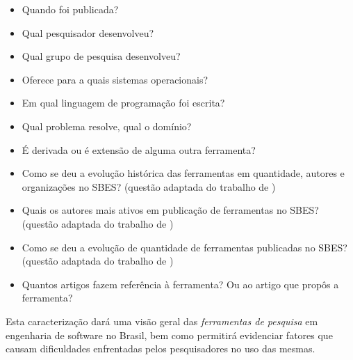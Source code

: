 \documentclass[conference]{IEEEtran}
\begin{document}
\begin{itemize}
\item Quando foi publicada?
\item Qual pesquisador desenvolveu?
\item Qual grupo de pesquisa desenvolveu?
\item Oferece para a quais sistemas operacionais?
\item Em qual linguagem de programação foi escrita?
\item Qual problema resolve, qual o domínio?
\item É derivada ou é extensão de alguma outra ferramenta?
\item Como se deu a evolução histórica das ferramentas em quantidade, autores
  e organizações no SBES? (questão adaptada do trabalho de
  \cite{Cavalcanti11})
\item Quais os autores mais ativos em publicação de ferramentas no SBES?
  (questão adaptada do trabalho de \cite{Cavalcanti11})
\item Como se deu a evolução de quantidade de ferramentas publicadas no SBES?
  (questão adaptada do trabalho de \cite{Cavalcanti11})
\item Quantos artigos fazem referência à ferramenta? Ou ao artigo que propôs a
  ferramenta?
\end{itemize}

Esta caracterização dará uma visão geral das {\it ferramentas de pesquisa}
em engenharia de software no Brasil, bem como permitirá evidenciar fatores que
causam dificuldades enfrentadas pelos pesquisadores no uso das mesmas.

%
%
%
\end{document}
